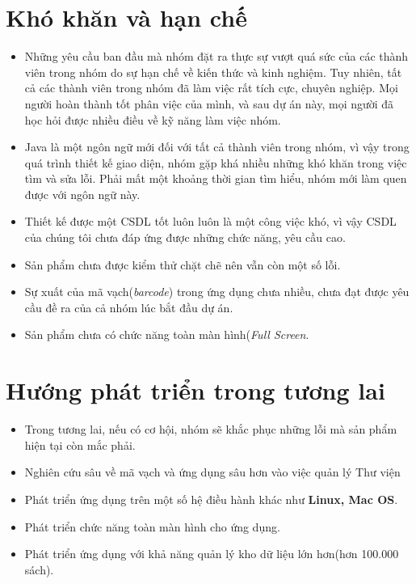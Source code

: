 \documentclass[12pt]{report}
\begin{document}
		\section{Khó khăn và hạn chế}
			\begin{itemize}
				\item Những yêu cầu ban đầu mà nhóm đặt ra thực sự vượt quá sức của các thành viên trong nhóm do sự hạn chế về kiến thức và kinh nghiệm. Tuy nhiên, tất cả các thành viên trong nhóm đã làm việc rất tích cực, chuyên nghiệp. Mọi người hoàn thành tốt phân việc của mình, và sau dự án này, mọi người đã học hỏi được nhiều điều về kỹ năng làm việc nhóm.
				\item Java là một ngôn ngữ mới đối với tất cả thành viên trong nhóm, vì vậy trong quá trình thiết kế giao diện, nhóm gặp khá nhiều những khó khăn trong việc tìm và sửa lỗi. Phải mất một khoảng thời gian tìm hiểu, nhóm mới làm quen được với ngôn ngữ này.
				\item Thiết kế được một CSDL tốt luôn luôn là một công việc khó, vì vậy CSDL của chúng tôi chưa đáp ứng được những chức năng, yêu cầu cao. 
				\item Sản phẩm chưa được kiểm thử chặt chẽ nên vẫn còn một số lỗi.
				\item Sự xuất của mã vạch(\textit{barcode}) trong ứng dụng chưa nhiều, chưa đạt được yêu cầu đề ra của cả nhóm lúc bắt đầu dự án.
				\item Sản phẩm chưa có chức năng toàn màn hình(\textit{Full Screen}.
			\end{itemize}
		\section{Hướng phát triển trong tương lai}
			\begin{itemize}
				\item Trong tương lai, nếu có cơ hội, nhóm sẽ khắc phục những lỗi mà sản phẩm hiện tại còn mắc phải.
				\item Nghiên cứu sâu về mã vạch và ứng dụng sâu hơn vào việc quản lý Thư viện
				\item Phát triển ứng dụng trên một số hệ điều hành khác như \textbf{Linux, Mac OS}.
				\item Phát triển chức năng toàn màn hình cho ứng dụng.
				\item Phát triển ứng dụng với khả năng quản lý kho dữ liệu lớn hơn(hơn 100.000 sách).
			\end{itemize}
	\newpage
\end{document}
